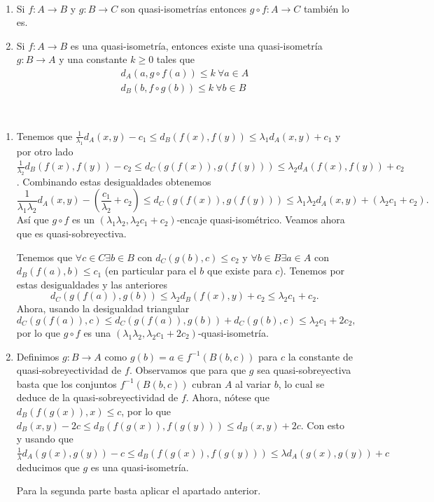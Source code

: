 \documentclass[twoside, 11pt]{article}
\begin{document}
\begin{prop}\
\begin{enumerate}
\item Si $f:A\to B$ y $g:B\to C$ son quasi-isometrías entonces $g\circ f:A\to C$ también lo es.
\item Si $f:A\to B$ es una quasi-isometría, entonces existe una quasi-isometría $g:B\to A$ y una constante $k\geq 0$ tales que
\begin{align*}
d_A(a,g\circ f(a))\leq k \ \forall a\in A\\
d_B(b,f\circ g(b))\leq k \ \forall b\in B
\end{align*}
\end{enumerate}
\end{prop}
\begin{dem}\
\begin{enumerate}
\item Tenemos que $\frac{1}{\lambda_1}d_A(x,y)-c_1\leq d_B(f(x),f(y))\leq\lambda_1 d_A(x,y)+c_1$ y por otro lado $\frac{1}{\lambda_2}d_B(f(x),f(y))-c_2\leq d_C(g(f(x)),g(f(y)))\leq\lambda_2 d_A(f(x),f(y))+c_2$. Combinando estas desigualdades obtenemos
\[
\frac{1}{\lambda_1\lambda_2}d_A(x,y)-\left(\frac{c_1}{\lambda_2}+c_2\right)\leq d_C(g(f(x)),g(f(y)))\leq \lambda_1\lambda_2 d_A(x,y)+(\lambda_2 c_1+c_2).
\]
Así que $g\circ f$ es un $(\lambda_1\lambda_2, \lambda_2 c_1+c_2)$-encaje quasi-isométrico. Veamos ahora que es quasi-sobreyectiva. 

Tenemos que $\forall c\in C\exists b\in B$ con $d_C(g(b),c)\leq c_2$ y $\forall b\in B\exists a\in A$ con $d_B(f(a),b)\leq c_1$ (en particular para el $b$ que existe para $c$). Tenemos por estas desigualdades y las anteriores 
\[
d_C(g(f(a)),g(b))\leq \lambda_2 d_B(f(x),y)+c_2\leq \lambda_2 c_1+c_2.
\]
Ahora, usando la desigualdad triangular
\[
d_C(g(f(a)),c)\leq d_C(g(f(a)),g(b))+d_C(g(b),c)\leq \lambda_2c_1 +2c_2,
\]
por lo que $g\circ f$ es una $(\lambda_1\lambda_2, \lambda_2c_1 +2c_2)$-quasi-isometría. 
\item Definimos $g:B\to A$ como $g(b)=a\in f^{-1}(B(b,c))$ para $c$ la constante de quasi-sobreyectividad de $f$. Observamos que para que $g$ sea quasi-sobreyectiva basta que los conjuntos $f^{-1}(B(b,c))$ cubran $A$ al variar $b$, lo cual se deduce de la quasi-sobreyectividad de $f$. Ahora, nótese que $d_B(f(g(x)),x)\leq c$, por lo que $d_B(x,y)-2c\leq d_B(f(g(x)),f(g(y)))\leq d_B(x,y)+2c$. Con esto y usando que $\frac{1}{\lambda}d_A(g(x),g(y))-c\leq d_B(f(g(x)),f(g(y)))\leq \lambda d_A(g(x),g(y))+c$ deducimos que $g$ es una quasi-isometría. 

Para la segunda parte basta aplicar el apartado anterior. 
\end{enumerate}
\QED
\end{dem}
\end{document}
